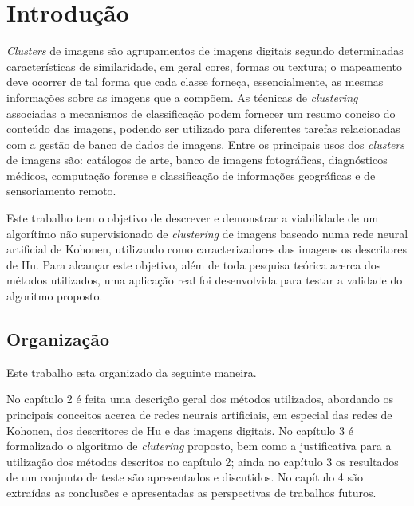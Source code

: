 \chapter{Introdução}

\textit{Clusters} de imagens são agrupamentos de imagens digitais segundo determinadas
características de similaridade, em geral cores, formas ou textura; o mapeamento
deve ocorrer de tal forma que cada classe forneça, essencialmente, as mesmas
informações sobre as imagens que a compõem. As técnicas de \textit{clustering}
associadas a mecanismos de classificação podem fornecer um resumo conciso do
conteúdo das imagens, podendo ser utilizado para diferentes tarefas relacionadas
com a gestão de banco de dados de imagens. Entre os principais usos dos \textit{clusters}
de imagens são: catálogos de arte, banco de imagens fotográficas, diagnósticos
médicos, computação forense e classificação de informações geográficas e de
sensoriamento remoto.

Este trabalho tem o objetivo de descrever e demonstrar a viabilidade de um
algorítimo não supervisionado de \textit{clustering} de imagens baseado numa rede neural
artificial de Kohonen, utilizando como caracterizadores das imagens os
descritores de Hu. Para alcançar este objetivo, além de toda pesquisa teórica
acerca dos métodos utilizados, uma aplicação real foi desenvolvida para testar
a validade do algoritmo proposto.

\section{Organização}

Este trabalho esta organizado da seguinte maneira.

No capítulo 2 é feita uma descrição geral dos métodos utilizados, abordando os
principais conceitos acerca de redes neurais artificiais, em especial das redes
de Kohonen, dos descritores de Hu e das imagens digitais. No capítulo 3 é
formalizado o algoritmo de \textit{clutering} proposto, bem como a justificativa para a
utilização dos métodos descritos no capítulo 2; ainda no capítulo 3 os
resultados de um conjunto de teste são apresentados e discutidos. No capítulo
4 são extraídas as conclusões e apresentadas as perspectivas de
trabalhos futuros.

